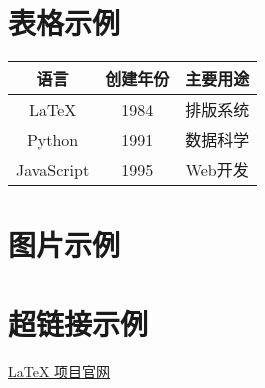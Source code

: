 \documentclass{article}
\begin{document}
\section{表格示例}
\begin{center}
\begin{tabular}{|c|c|c|}
\hline
语言 & 创建年份 & 主要用途 \\
\hline
LaTeX & 1984 & 排版系统 \\
Python & 1991 & 数据科学 \\
JavaScript & 1995 & Web开发 \\
\hline
\end{tabular}
\end{center}

\section{图片示例}

\section{超链接示例}
\href{https://www.latex-project.org/}{LaTeX 项目官网}
\end{document}

